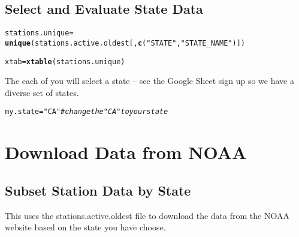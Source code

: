 \documentclass{article}\usepackage[]{graphicx}\usepackage[dvipsnames]{xcolor}
\makeatletter
\newcommand{\hlstr}[1]{\textcolor[rgb]{0.192,0.494,0.8}{#1}}%
\newcommand{\hlcom}[1]{\textcolor[rgb]{0.678,0.584,0.686}{\textit{#1}}}%
\newcommand{\hlstd}[1]{\textcolor[rgb]{0.345,0.345,0.345}{#1}}%
\newcommand{\hlkwb}[1]{\textcolor[rgb]{0.69,0.353,0.396}{#1}}%
\newcommand{\hlkwd}[1]{\textcolor[rgb]{0.737,0.353,0.396}{\textbf{#1}}}%
\newenvironment{kframe}{%
 \def\at@end@of@kframe{}%
 \ifinner\ifhmode%
  \def\at@end@of@kframe{\end{minipage}}%
  \begin{minipage}{\columnwidth}%
 \fi\fi%
 \def\FrameCommand##1{\hskip\@totalleftmargin \hskip-\fboxsep
 \colorbox{shadecolor}{##1}\hskip-\fboxsep
     \hskip-\linewidth \hskip-\@totalleftmargin \hskip\columnwidth}%
 \MakeFramed {\advance\hsize-\width
   \@totalleftmargin\z@ \linewidth\hsize
   \@setminipage}}%
 {\par\unskip\endMakeFramed%
 \at@end@of@kframe}
\newenvironment{knitrout}{}{} %
\makeatother
\begin{document}
\subsection{Select and Evaluate State Data}

\begin{knitrout}
\color{fgcolor}\begin{kframe}
\begin{alltt}
\hlstd{stations.unique} \hlkwb{=}
  \hlkwd{unique}\hlstd{(stations.active.oldest[,}\hlkwd{c}\hlstd{(}\hlstr{"STATE"}\hlstd{,} \hlstr{"STATE_NAME"}\hlstd{)])}
\end{alltt}


{\ttfamily\noindent\bfseries{}}\begin{alltt}
\hlstd{xtab} \hlkwb{=} \hlkwd{xtable}\hlstd{(stations.unique)}
\end{alltt}


{\ttfamily\noindent\bfseries{}}\end{kframe}
\end{knitrout}

The each of you will select a state -- see the Google Sheet sign up so we have a diverse set of states.

\begin{knitrout}
\color{fgcolor}\begin{kframe}
\begin{alltt}
\hlstd{my.state} \hlkwb{=} \hlstr{"CA"} \hlcom{# change the "CA" to your state}
\end{alltt}
\end{kframe}
\end{knitrout}

\section{Download Data from NOAA}

\subsection{Subset Station Data by State}

This uses the stations.active.oldest file to download the data from the NOAA website based on the state you have choose.
\end{document}
